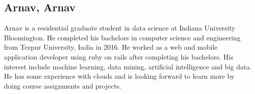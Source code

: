 \subsection{Arnav, Arnav}
Arnav is a residential graduate student in data science at Indiana University Bloomington.
He completed his bachelors in computer science and engineering from Tezpur University, India in 2016.
He worked as a web and mobile application developer using ruby on rails after completing his bachelors.
His interest include machine learning, data mining, artificial intelligence and big data.
He has some experience with clouds and is looking forward to learn more by doing course assignments and projects.
